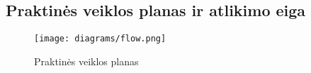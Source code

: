 \newpage

\subsection*{Praktinės veiklos planas ir atlikimo eiga}

\begin{figure}[!htb]
    \centering
    \texttt{[image: diagrams/flow.png]}
    \caption{Praktinės veiklos planas}
    \label{fig:plan}
\end{figure}